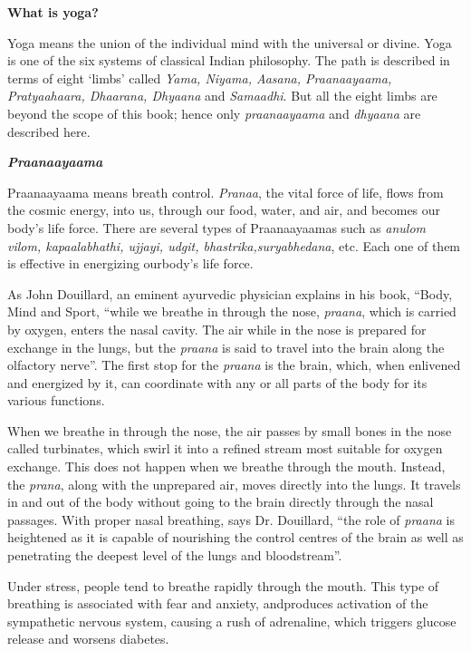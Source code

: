 \vskip 6pt

\noindent\textbf{What is yoga?}

Yoga means the union of the individual mind with the universal or divine. Yoga is one of the six systems of classical Indian philo\-sophy. The path is described in terms of eight ‘limbs’ called \textit{Yama, Niyama, Aasana, Praanaayaama, Pratyaahaara, Dhaarana, Dhyaana} and \textit{Samaadhi}. But all the eight limbs are beyond the scope of this book; hence only \textit{praanaayaama} and \textit{dhyaana} are described here.

\noindent\textbf{\textit{Praanaayaama}}

Praanaayaama means breath control. \textit{Pranaa}, the vital force of life, flows from the cosmic energy, into us, through our food, water, and air, and becomes our body’s life force. There are several types of Praanaa\-yaamas such as \textit{anulom vilom, kapaalabhathi, ujjayi, udgit, bhastrika,\break suryabhedana}, etc. Each one of them is effective in energizing our\break body’s life force.

As John Douillard, an eminent ayurvedic physician explains in his book, “Body, Mind and Sport, “while we breathe in through the nose, \textit{praana}, which is carried by oxygen, enters the nasal cavity. The air while in the nose is prepared for exchange in the lungs, but the \textit{praana} is said to travel into the brain along the olfactory nerve”. The first stop for the \textit{praana} is the brain, which, when enlivened and energized by it, can coordinate with any or all parts of the body for its various functions.

When we breathe in through the nose, the air passes by small bones in the nose called turbinates, which swirl it into a refined stream most suitable for oxygen exchange. This does not happen when we breathe through the mouth. Instead, the \textit{prana}, along with the unprepared air, moves directly into the lungs. It travels in and out of the body without going to the brain directly through the nasal passages. With proper nasal breathing, says Dr. Douillard, “the role of \textit{praana} is heightened as it is capable of nourishing the control centres of the brain as well as penetrating the deepest level of the lungs and bloodstream”.

Under stress, people tend to breathe rapidly through the mouth. This type of breathing is associated with fear and anxiety, and\break produces activation of the sympathetic nervous system, causing a rush of adrenaline, which triggers glucose release and worsens diabetes.

